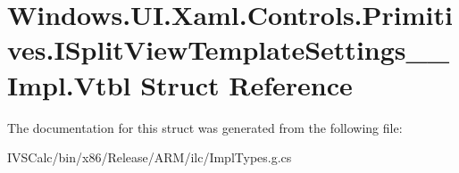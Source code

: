 \hypertarget{struct_windows_1_1_u_i_1_1_xaml_1_1_controls_1_1_primitives_1_1_i_split_view_template_settings_____impl_1_1_vtbl}{}\section{Windows.\+U\+I.\+Xaml.\+Controls.\+Primitives.\+I\+Split\+View\+Template\+Settings\+\_\+\+\_\+\+Impl.\+Vtbl Struct Reference}
\label{struct_windows_1_1_u_i_1_1_xaml_1_1_controls_1_1_primitives_1_1_i_split_view_template_settings_____impl_1_1_vtbl}


The documentation for this struct was generated from the following file\+:\begin{DoxyCompactItemize}
\item 
I\+V\+S\+Calc/bin/x86/\+Release/\+A\+R\+M/ilc/Impl\+Types.\+g.\+cs\end{DoxyCompactItemize}
